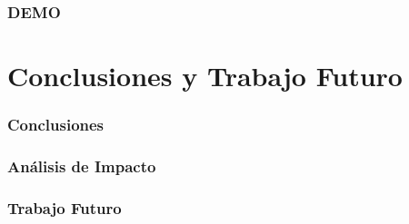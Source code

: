 \documentclass[usenames,dvipsnames]{beamer}
\begin{document}
\begin{frame} 
\frametitle{DEMO} 
\end{frame}


\section{Conclusiones y Trabajo Futuro}
\begin{frame} 
\frametitle{Conclusiones} 
\end{frame}

\begin{frame} 
\frametitle{Análisis de Impacto} 
\end{frame}

\begin{frame} 
\frametitle{Trabajo Futuro} 
\end{frame}
\end{document}

